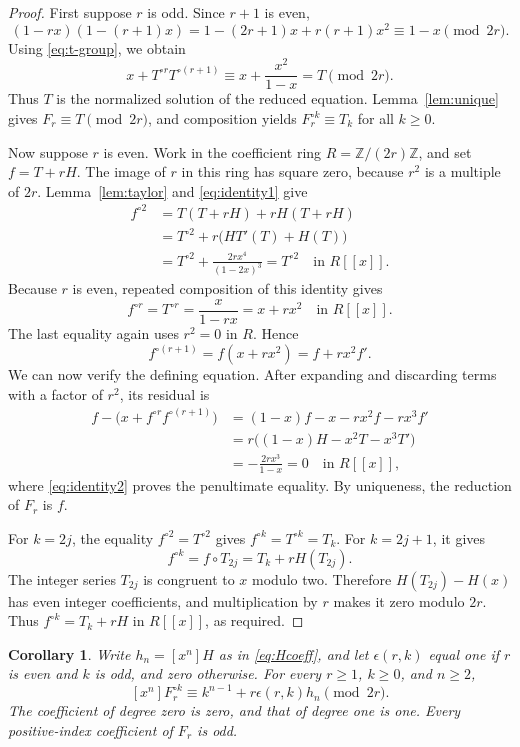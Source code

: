 \documentclass[11pt,a4paper]{article}
\newtheorem{corollary}[theorem]{Corollary}
\theoremstyle{remark}
\newcommand{\Z}{\mathbb Z}
\newcommand{\coeff}[2]{[x^{#1}]#2}
\begin{document}
\begin{proof}
First suppose $r$ is odd. Since $r+1$ is even,
\[
(1-rx)(1-(r+1)x)
=1-(2r+1)x+r(r+1)x^2\equiv1-x\pmod{2r}.
\]
Using \eqref{eq:t-group}, we obtain
\[
x+T^{\circ r}T^{\circ(r+1)}
\equiv x+\frac{x^2}{1-x}=T\pmod{2r}.
\]
Thus $T$ is the normalized solution of the reduced equation.
Lemma~\ref{lem:unique} gives $F_r\equiv T\pmod{2r}$, and
composition yields $F_r^{\circ k}\equiv T_k$ for all $k\ge0$.

Now suppose $r$ is even. Work in the coefficient ring
$R=\Z/(2r)\Z$, and set $f=T+rH$. The image of $r$ in this ring
has square zero, because $r^2$ is a multiple of $2r$.
Lemma~\ref{lem:taylor} and \eqref{eq:identity1} give
\begin{align*}
f^{\circ2}
&=T(T+rH)+rH(T+rH)\\
&=T^{\circ2}+r\bigl(HT'(T)+H(T)\bigr)\\
&=T^{\circ2}+\frac{2rx^4}{(1-2x)^3}
=T^{\circ2}\quad\text{in }R[[x]].
\end{align*}
Because $r$ is even, repeated composition of this identity gives
\[
f^{\circ r}=T^{\circ r}=\frac{x}{1-rx}=x+rx^2
\quad\text{in }R[[x]].
\]
The last equality again uses $r^2=0$ in $R$. Hence
\[
f^{\circ(r+1)}=f(x+rx^2)=f+rx^2f'.
\]
We can now verify the defining equation. After expanding and discarding
terms with a factor of $r^2$, its residual is
\begin{align*}
f-\bigl(x+f^{\circ r}f^{\circ(r+1)}\bigr)
&=(1-x)f-x-rx^2f-rx^3f'\\
&=r\bigl((1-x)H-x^2T-x^3T'\bigr)\\
&=-\frac{2rx^3}{1-x}=0\quad\text{in }R[[x]],
\end{align*}
where \eqref{eq:identity2} proves the penultimate equality.
By uniqueness, the reduction of $F_r$ is $f$.

For $k=2j$, the equality $f^{\circ2}=T^{\circ2}$ gives
$f^{\circ k}=T^{\circ k}=T_k$. For $k=2j+1$, it gives
\[
f^{\circ k}=f\circ T_{2j}=T_k+rH(T_{2j}).
\]
The integer series $T_{2j}$ is congruent to $x$ modulo two.
Therefore $H(T_{2j})-H(x)$ has even integer coefficients, and
multiplication by $r$ makes it zero modulo $2r$. Thus
$f^{\circ k}=T_k+rH$ in $R[[x]]$, as required.
\end{proof}

\begin{corollary}\label{cor:coeff}
Write $h_n=\coeff{n}{H}$ as in \eqref{eq:Hcoeff}, and let
$\epsilon(r,k)$ equal one if $r$ is even and $k$ is odd, and zero
otherwise. For every $r\ge1$, $k\ge0$, and $n\ge2$,
\[
\coeff{n}{F_r^{\circ k}}
\equiv k^{n-1}+r\epsilon(r,k)h_n\pmod{2r}.
\]
The coefficient of degree zero is zero, and that of degree one is one.
Every positive-index coefficient of $F_r$ is odd.
\end{corollary}
\end{document}

